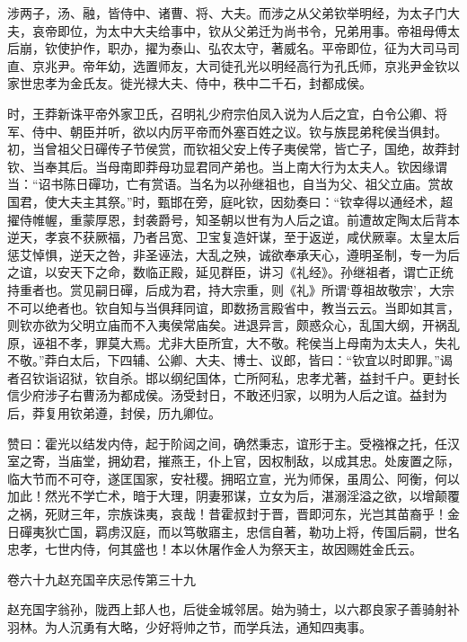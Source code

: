 \documentclass[12pt,UTF8]{ctexbook}
\begin{document}
涉两子，汤、融，皆侍中、诸曹、将、大夫。而涉之从父弟钦举明经，为太子门大夫，哀帝即位，为太中大夫给事中，钦从父弟迁为尚书令，兄弟用事。帝祖母傅太后崩，钦使护作，职办，擢为泰山、弘农太守，著威名。平帝即位，征为大司马司直、京兆尹。帝年幼，选置师友，大司徒孔光以明经高行为孔氏师，京兆尹金钦以家世忠孝为金氏友。徙光禄大夫、侍中，秩中二千石，封都成侯。



时，王莽新诛平帝外家卫氏，召明礼少府宗伯凤入说为人后之宜，白令公卿、将军、侍中、朝臣并听，欲以内厉平帝而外塞百姓之议。钦与族昆弟秺侯当俱封。初，当曾祖父日磾传子节侯赏，而钦祖父安上传子夷侯常，皆亡子，国绝，故莽封钦、当奉其后。当母南即莽母功显君同产弟也。当上南大行为太夫人。钦因缘谓当：“诏书陈日磾功，亡有赏语。当名为以孙继祖也，自当为父、祖父立庙。赏故国君，使大夫主其祭。”时，甄邯在旁，庭叱钦，因劾奏曰：“钦幸得以通经术，超擢侍帷幄，重蒙厚恩，封袭爵号，知圣朝以世有为人后之谊。前遭故定陶太后背本逆天，孝哀不获厥福，乃者吕宽、卫宝复造奸谋，至于返逆，咸伏厥辜。太皇太后惩艾悼惧，逆天之咎，非圣诬法，大乱之殃，诚欲奉承天心，遵明圣制，专一为后之谊，以安天下之命，数临正殿，延见群臣，讲习《礼经》。孙继祖者，谓亡正统持重者也。赏见嗣日磾，后成为君，持大宗重，则《礼》所谓‘尊祖故敬宗’，大宗不可以绝者也。钦自知与当俱拜同谊，即数扬言殿省中，教当云云。当即如其言，则钦亦欲为父明立庙而不入夷侯常庙矣。进退异言，颇惑众心，乱国大纲，开祸乱原，诬祖不孝，罪莫大焉。尤非大臣所宜，大不敬。秺侯当上母南为太夫人，失礼不敬。”莽白太后，下四辅、公卿、大夫、博士、议郎，皆曰：“钦宜以时即罪。”谒者召钦诣诏狱，钦自杀。邯以纲纪国体，亡所阿私，忠孝尤著，益封千户。更封长信少府涉子右曹汤为都成侯。汤受封日，不敢还归家，以明为人后之谊。益封为后，莽复用钦弟遵，封侯，历九卿位。



赞曰：霍光以结发内侍，起于阶闼之间，确然秉志，谊形于主。受襁褓之托，任汉室之寄，当庙堂，拥幼君，摧燕王，仆上官，因权制敌，以成其忠。处废置之际，临大节而不可夺，遂匡国家，安社稷。拥昭立宣，光为师保，虽周公、阿衡，何以加此！然光不学亡术，暗于大理，阴妻邪谋，立女为后，湛溺淫溢之欲，以增颠覆之祸，死财三年，宗族诛夷，哀哉！昔霍叔封于晋，晋即河东，光岂其苗裔乎！金日磾夷狄亡国，羁虏汉庭，而以笃敬寤主，忠信自著，勒功上将，传国后嗣，世名忠孝，七世内侍，何其盛也！本以休屠作金人为祭天主，故因赐姓金氏云。





卷六十九赵充国辛庆忌传第三十九



赵充国字翁孙，陇西上邽人也，后徙金城邻居。始为骑士，以六郡良家子善骑射补羽林。为人沉勇有大略，少好将帅之节，而学兵法，通知四夷事。
\end{document}
